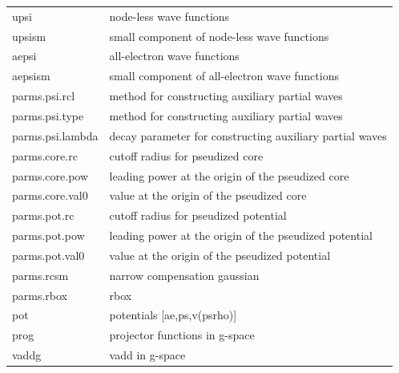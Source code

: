 \documentclass[final,12pt]{article}
\begin{document}
{{{{{{\begin{center}
\begin{tabular}{ll}
 upsi             & node-less wave functions                                 \\
 upsism           & small component of node-less wave functions              \\
 aepsi            & all-electron wave functions                              \\
 aepsism          & small component of all-electron wave functions           \\
 parms.psi.rcl    & method for constructing auxiliary partial waves          \\
 parms.psi.type   & method for constructing auxiliary partial waves          \\
 parms.psi.lambda & decay parameter for constructing auxiliary partial waves \\
 parms.core.rc    & cutoff radius for pseudized core                         \\
 parms.core.pow   & leading power at the origin of the pseudized core        \\
 parms.core.val0  & value at the origin of the pseudized core                \\
 parms.pot.rc     & cutoff radius for pseudized potential                    \\
 parms.pot.pow    & leading power at the origin of the pseudized potential   \\
 parms.pot.val0   & value at the origin of the pseudized potential           \\
 parms.rcsm       & narrow compensation gaussian                             \\
 parms.rbox       & rbox                                                     \\
 pot              & potentials [ae,ps,v(psrho)]                              \\
 prog             & projector functions in g-space                           \\
 vaddg            & vadd in g-space                                          \\
\end{tabular}
\end{center}

 
 
 
 
 
 
 
 
 
 
 
 
 
 
}}}}}}
\end{document}
